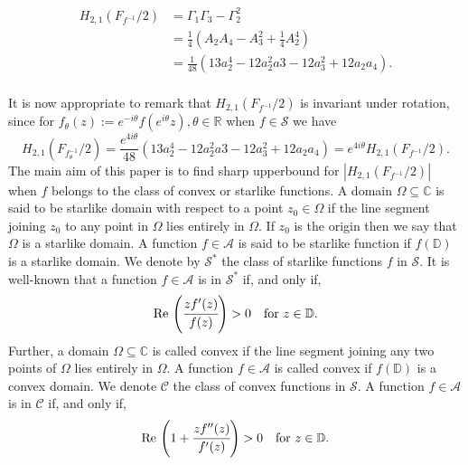 \documentclass[a4paper,12pt]{amsart}
\theoremstyle{definition}
\numberwithin{equation}{section}
\begin{document}
\begin{equation}\label{hankel}
\begin{aligned}
	H_{2,1}(F_{f^{-1}}/2)
&=\Gamma_1\Gamma_3-\Gamma_{2}^2 \\[2mm]
&=\frac{1}{4}\left(A_2A_4-A_3^2+\frac{1}{4}A_2^4\right)\\[2mm]
&=\frac{1}{48}\left(13a_2^4-12a_2^2a3-12a_3^2+12a_2a_4\right).
\end{aligned}
\end{equation}
\\[1mm]
It is now appropriate to remark that $H_{2,1}(F_{f^{-1}}/2)$ is invariant under rotation, since for $f_{\theta}(z):=e^{-i \theta} f\left(e^{i \theta} z\right), \theta \in \mathbb{R}$ when $f \in \mathcal{S}$ we have
$$
H_{2,1}(F_{f_{\theta}^{-1}}/2)=\frac{e^{4 i \theta}}{48}\left(13a_2^4-12a_2^2a3-12a_3^2+12a_2a_4\right)=e^{4 i \theta} H_{2,1}(F_{f^{-1}}/2) .
$$
The main aim of this paper is to find sharp upperbound for $|H_{2,1}(F_{f^{-1}}/2)|
$ when $f$ belongs to the class of convex or starlike functions. A domain $\Omega \subseteq \mathbb{C}$ is said to be starlike domain with respect to a point $z_{0}\in \Omega$ if the line segment joining $z_{0}$ to any point in $\Omega$ lies entirely in $\Omega$. If $z_0$ is the origin then we say that $\Omega$ is a starlike domain. A function $f \in \mathcal{A}$ is said to be starlike function if $f(\mathbb{D})$ is a starlike domain. We denote by $\mathcal{S}^*$ the class of starlike functions $f$ in $\mathcal{S}$. It is well-known that a function $f \in \mathcal{A}$ is in $\mathcal{S}^*$ if, and only if, 
\begin{equation}\label{star}
{\rm Re\,}\left( \cfrac{zf'(z)}{f(z)} \right) > 0 \quad \text{for}\,\, z \in \mathbb{D}.
\end{equation}
Further, a domain $\Omega\subseteq\mathbb{C}$ is called convex if the line segment joining any two points of $\Omega$ lies entirely in $\Omega$. A function $f\in\mathcal{A}$ is called convex if $f(\mathbb{D})$ is a convex domain. We denote $\mathcal{C}$  the class of convex functions in $\mathcal{S}$. A function $f \in \mathcal{A}$ is in $\mathcal{C}$ if, and only if, 
\begin{equation}\label{convex}
{\rm Re\,}\left( 1+\cfrac{zf''(z)}{f'(z)} \right) > 0 \quad \text{for}\,\, z \in \mathbb{D}.
\end{equation}
\end{document}
